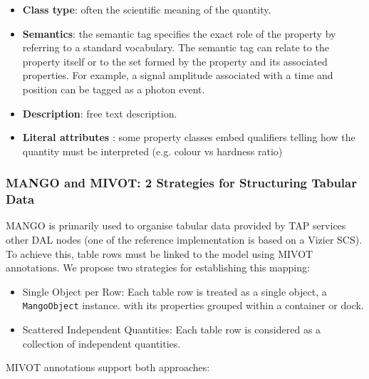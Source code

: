 \documentclass[11pt,a4paper]{ivoa}
\begin{document}
\begin{itemize}[noitemsep,topsep=0pt,parsep=0pt,partopsep=0pt]
    \item \textbf{Class type}: often the scientific meaning of the quantity.
    \item \textbf{Semantics}: the semantic tag specifies the exact role of the property by
          referring to a standard vocabulary. The semantic tag can relate to the property itself
          or to the set formed by the property and its associated properties.
          For example, a signal amplitude associated with a time and position can be tagged
          as a photon event.
    \item \textbf{Description}: free text description.
    \item \textbf{Literal attributes} : some property classes embed qualifiers telling 
          how the quantity must be interpreted (e.g. colour vs hardness ratio)
\end{itemize}


\subsubsection{MANGO and MIVOT: 2 Strategies for Structuring Tabular Data}

MANGO is primarily used to organise tabular data provided by TAP services \citep{2019ivoa.spec.0927D} 
other DAL nodes (one of the reference implementation is based on a Vizier SCS).
To achieve this, table rows must be linked to the model using MIVOT annotations.
We propose two strategies for establishing this mapping:
\begin{itemize}[noitemsep,topsep=0pt,parsep=0pt,partopsep=0pt]
    \item Single Object per Row: Each table row is treated as a single object, a \texttt{MangoObject} instance.
          with its properties grouped within a container or dock.
    \item Scattered Independent Quantities: Each table row is considered as a collection of independent quantities.
\end{itemize}
\hfill \break

MIVOT annotations support both approaches:
\end{document}
